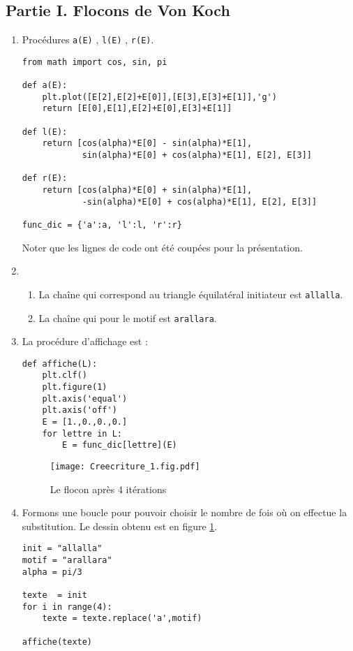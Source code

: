 \subsection*{Partie I. Flocons de Von Koch}
\begin{enumerate}
 \item Procédures \verb|a(E)| , \verb|l(E)| , \verb|r(E)|.
\begin{verbatim}
from math import cos, sin, pi

def a(E):
    plt.plot([E[2],E[2]+E[0]],[E[3],E[3]+E[1]],'g')
    return [E[0],E[1],E[2]+E[0],E[3]+E[1]]
    
def l(E):
    return [cos(alpha)*E[0] - sin(alpha)*E[1], 
            sin(alpha)*E[0] + cos(alpha)*E[1], E[2], E[3]]

def r(E):
    return [cos(alpha)*E[0] + sin(alpha)*E[1],
            -sin(alpha)*E[0] + cos(alpha)*E[1], E[2], E[3]]
    
func_dic = {'a':a, 'l':l, 'r':r}
\end{verbatim}
Noter que les lignes de code ont été coupées pour la présentation.
\item \begin{enumerate}
 \item La chaîne qui correspond au triangle équilatéral initiateur est \verb|allalla|.
\item La chaîne qui pour le motif est \verb|arallara|.
\end{enumerate}

\item La procédure d'affichage est :
\begin{verbatim}
def affiche(L):
    plt.clf()
    plt.figure(1)
    plt.axis('equal')
    plt.axis('off')
    E = [1.,0.,0.,0.]
    for lettre in L:
        E = func_dic[lettre](E)
\end{verbatim}

\begin{figure}
 \centering
 \texttt{[image: Creecriture\_1.fig.pdf]}
 \caption{Le flocon après 4 itérations}
 \label{fig:Creecriture_1}
\end{figure}

\item Formons une boucle pour pouvoir choisir le nombre de fois où on effectue la substitution. Le dessin obtenu est en figure \ref{fig:Creecriture_1}.
\begin{verbatim}
init = "allalla"
motif = "arallara"
alpha = pi/3

texte  = init
for i in range(4):
    texte = texte.replace('a',motif)

affiche(texte)
\end{verbatim}

\end{enumerate}

